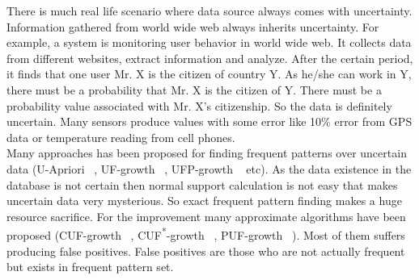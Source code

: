 There is much real life scenario where data source always comes with uncertainty. Information gathered from world wide web always inherits uncertainty. For example, a system is monitoring user behavior in world wide web. It collects data from different websites, extract information and analyze. After the certain period, it finds that one user Mr. X is the citizen of country Y. As he/she can work in Y, there must be a probability that Mr. X is the citizen of Y. There must be a probability value associated with Mr. X's citizenship. So the data is definitely uncertain. Many sensors produce values with some error like 10\% error from GPS data or temperature reading from cell phones.\\
Many approaches has been proposed for finding frequent patterns over uncertain data (U-Apriori ~\cite{u_priori}, UF-growth ~\cite{uf_growth}, UFP-growth ~\cite{ufp_growth} etc). As the data existence in the database is not certain then normal support calculation is not easy that makes uncertain data very mysterious. So exact frequent pattern finding makes a huge resource sacrifice. For the improvement many approximate algorithms have been proposed (CUF-growth ~\cite{cuf_growth}, CUF\textsuperscript{*}-growth ~\cite{cuf_growth}, PUF-growth ~\cite{puf_growth}). Most of them suffers producing false positives. False positives are those who are not actually frequent but exists in frequent pattern set.

